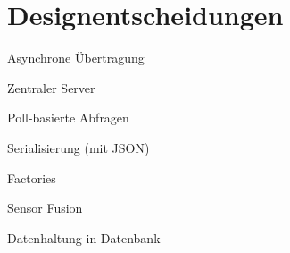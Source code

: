 \chapter{Designentscheidungen}
\begin{capitemize}[Designentscheidungen]
	\item Asynchrone Übertragung
	\item Zentraler Server
	\item Poll-basierte Abfragen
	\item Serialisierung (mit JSON)
	\item Factories
	\item Sensor Fusion
	\item Datenhaltung in Datenbank
\end{capitemize}